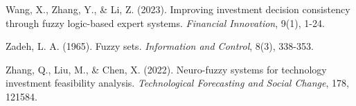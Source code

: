 \documentclass[12pt,a4paper]{article}
\begin{document}
\begin{thebibliography}{99}
Wang, X., Zhang, Y., \& Li, Z. (2023). Improving investment decision consistency through fuzzy logic-based expert systems. \textit{Financial Innovation}, 9(1), 1-24.

Zadeh, L. A. (1965). Fuzzy sets. \textit{Information and Control}, 8(3), 338-353.

Zhang, Q., Liu, M., \& Chen, X. (2022). Neuro-fuzzy systems for technology investment feasibility analysis. \textit{Technological Forecasting and Social Change}, 178, 121584.

\end{thebibliography}
\end{document}
